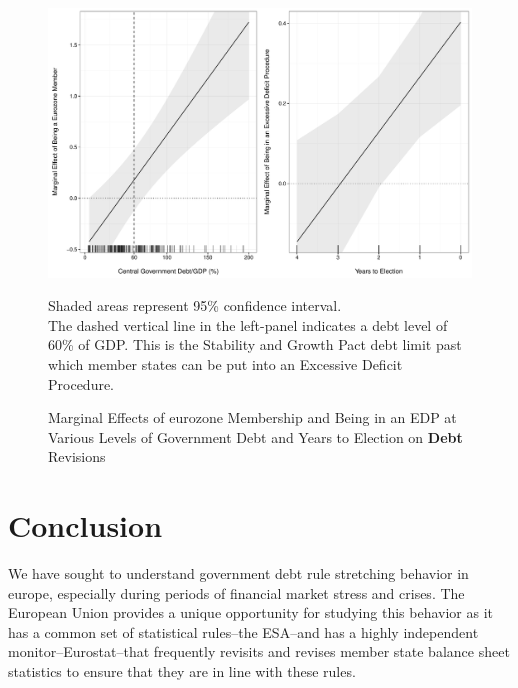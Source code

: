 \documentclass[]{article}
\begin{document}
\begin{figure}
    \caption{Marginal Effects of eurozone Membership and Being in an EDP at Various Levels of Government Debt and Years to Election on \textbf{Debt} Revisions}
    \label{me_debt_edp_elect}

    \begin{center}
        \includegraphics[scale=0.45]{figures/edp_debt_elect_me.pdf}
    \end{center}

	{\scriptsize{Shaded areas represent 95\% confidence interval.\\
    The dashed vertical line in the left-panel indicates a debt level of 60\% of GDP. This is the Stability and Growth Pact debt limit past which member states can be put into an Excessive Deficit Procedure.}}

\end{figure}

\begin{landscape}
    
\end{landscape}


\section{Conclusion}

We have sought to understand government debt rule stretching behavior in europe, especially during periods of financial market stress and crises. The European Union provides a unique opportunity for studying this behavior as it has a common set of statistical rules--the ESA--and has a highly independent monitor--Eurostat--that frequently revisits and revises member state balance sheet statistics to ensure that they are in line with these rules.
\end{document}
